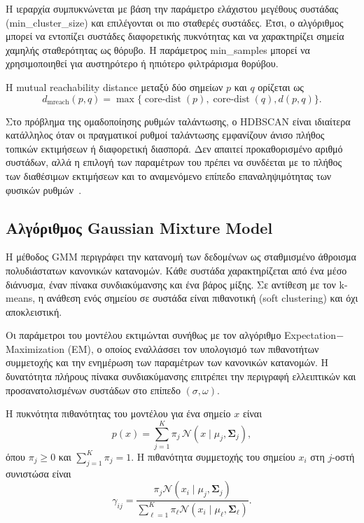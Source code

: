 Η ιεραρχία συμπυκνώνεται με βάση την παράμετρο ελάχιστου μεγέθους συστάδας (min\_cluster\_size) και επιλέγονται οι πιο σταθερές συστάδες. Έτσι, ο αλγόριθμος μπορεί να εντοπίζει συστάδες διαφορετικής πυκνότητας και να χαρακτηρίζει σημεία χαμηλής σταθερότητας ως θόρυβο. Η παράμετρος min\_samples μπορεί να χρησιμοποιηθεί για αυστηρότερο ή ηπιότερο φιλτράρισμα θορύβου.

Η mutual reachability distance μεταξύ δύο σημείων $p$ και $q$ ορίζεται ως
\begin{equation}
d_{\mathrm{mreach}}(p,q)=\max\{\operatorname{core\text{-}dist}(p),\operatorname{core\text{-}dist}(q),d(p,q)\}.
\label{eq:hdbscan-mutual-reachability}
\end{equation}

Στο πρόβλημα της ομαδοποίησης ρυθμών ταλάντωσης, ο HDBSCAN είναι ιδιαίτερα κατάλληλος όταν οι πραγματικοί ρυθμοί ταλάντωσης εμφανίζουν άνισο πλήθος τοπικών εκτιμήσεων ή διαφορετική διασπορά. Δεν απαιτεί προκαθορισμένο αριθμό συστάδων, αλλά η επιλογή των παραμέτρων του πρέπει να συνδέεται με το πλήθος των διαθέσιμων εκτιμήσεων και το αναμενόμενο επίπεδο επαναληψιμότητας των φυσικών ρυθμών~\cite{hdbscan2015,campello2013densityclustering}.

\subsection{Αλγόριθμος Gaussian Mixture Model}

Η μέθοδος GMM περιγράφει την κατανομή των δεδομένων ως σταθμισμένο άθροισμα πολυδιάστατων κανονικών κατανομών. Κάθε συστάδα χαρακτηρίζεται από ένα μέσο διάνυσμα, έναν πίνακα συνδιακύμανσης και ένα βάρος μίξης. Σε αντίθεση με τον k-means, η ανάθεση ενός σημείου σε συστάδα είναι πιθανοτική (soft clustering) και όχι αποκλειστική.

Οι παράμετροι του μοντέλου εκτιμώνται συνήθως με τον αλγόριθμο Expectation$-$Maximization (EM), ο οποίος εναλλάσσει τον υπολογισμό των πιθανοτήτων συμμετοχής και την ενημέρωση των παραμέτρων των κανονικών κατανομών. Η δυνατότητα πλήρους πίνακα συνδιακύμανσης επιτρέπει την περιγραφή ελλειπτικών και προσανατολισμένων συστάδων στο επίπεδο $(\sigma,\omega)$.

Η πυκνότητα πιθανότητας του μοντέλου για ένα σημείο $x$ είναι
\begin{equation}
p(x)=\sum_{j=1}^{K}\pi_j\,\mathcal{N}(x\mid\mu_j,\boldsymbol{\Sigma}_j),
\label{eq:gmm-density}
\end{equation}
όπου $\pi_j\geq 0$ και $\sum_{j=1}^{K}\pi_j=1$. Η πιθανότητα συμμετοχής του σημείου $x_i$ στη $j$-οστή συνιστώσα είναι
\begin{equation}
\gamma_{ij}=\frac{\pi_j\mathcal{N}(x_i\mid\mu_j,\boldsymbol{\Sigma}_j)}{\sum_{\ell=1}^{K}\pi_\ell\mathcal{N}(x_i\mid\mu_\ell,\boldsymbol{\Sigma}_\ell)}.
\label{eq:gmm-responsibility}
\end{equation}

